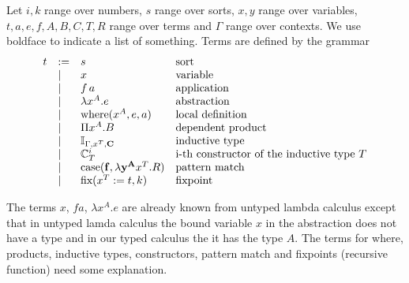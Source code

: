 \begin{definition}
  Let $i,k$ range over numbers, $s$ range over sorts, $x,y$ range over
  variables, $t, a, e, f, A, B, C, T, R$ range over terms and $\Gamma$ range
  over contexts. We use boldface to indicate a list of something. Terms are
  defined by the grammar
  $$
  \begin{array}{lllll}
    t &:= & s
    & \text{sort}

    \\

      & \mid & x
    & \text{variable}

    \\

      & \mid & f \, a
    & \text{application}

    \\

      & \mid & \lambda x^A. e
    & \text{abstraction}

    \\
        & \mid & \where(x^A, e, a) & \text{local definition}

    \\

      & \mid & \Pi x^A.B
    & \text{dependent product}

    \\

      & \mid & \Inductive_{\Gamma,x^T,\Cbold}
    & \text{inductive type}

    \\

      & \mid & \Constructor^i_T
    & \text{i-th constructor of the inductive type } T

    \\

      & \mid & \case(\fbold, \lambda \ybold^\Abold x^T.R)
    & \text{pattern match}

    \\

      & \mid & \fix(x^T := t, k)
    & \text{fixpoint}
  \end{array}
  $$
\end{definition}

The terms $x$, $f a$, $\lambda x^A.e$ are already known from untyped lambda
calculus except that in untyped lamda calculus the bound variable $x$ in the
abstraction does not have a type and in our typed calculus the it has the type
$A$. The terms for where, products, inductive types, constructors, pattern match
and fixpoints (recursive function) need some explanation.

